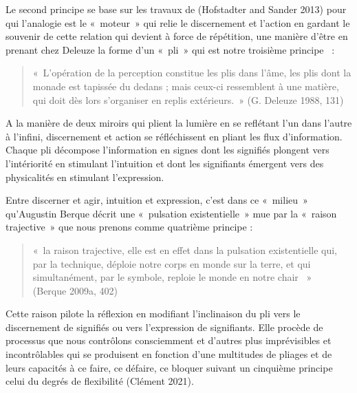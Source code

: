 \documentclass[
  letterpaper,
  DIV=11,
  numbers=noendperiod]{scrreprt}
\begin{document}
Le second principe se base sur les travaux de (Hofstadter and Sander
2013) pour qui l'analogie est le «~moteur~» qui relie le discernement et
l'action en gardant le souvenir de cette relation qui devient à force de
répétition, une manière d'être en prenant chez Deleuze la forme d'un
«~pli~» qui est notre troisième principe ~:

\begin{quote}
«~L'opération de la perception constitue les plis dans l'âme, les plis
dont la monade est tapissée du dedans ; mais ceux-ci ressemblent à une
matière, qui doit dès lors s'organiser en replis extérieurs.~» (G.
Deleuze 1988, 131)
\end{quote}

A la manière de deux miroirs qui plient la lumière en se reflétant l'un
dans l'autre à l'infini, discernement et action se réfléchissent en
pliant les flux d'information. Chaque pli décompose l'information en
signes dont les signifiés plongent vers l'intériorité en stimulant
l'intuition et dont les signifiants émergent vers des physicalités en
stimulant l'expression.

Entre discerner et agir, intuition et expression, c'est dans ce
«~milieu~» qu'Augustin Berque décrit une «~pulsation existentielle~» mue
par la «~raison trajective~» que nous prenons comme quatrième principe :

\begin{quote}
«~la raison trajective, elle est en effet dans la pulsation
existentielle qui, par la technique, déploie notre corps en monde sur la
terre, et qui simultanément, par le symbole, reploie le monde en notre
chair ~»~ (Berque 2009a, 402)
\end{quote}

Cette raison pilote la réflexion en modifiant l'inclinaison du pli vers
le discernement de signifiés ou vers l'expression de signifiants. Elle
procède de processus que nous contrôlons consciemment et d'autres plus
imprévisibles et incontrôlables qui se produisent en fonction d'une
multitudes de pliages et de leurs capacités à ce faire, ce défaire, ce
bloquer suivant un cinquième principe celui du degrés de flexibilité
(Clément 2021).
\end{document}
